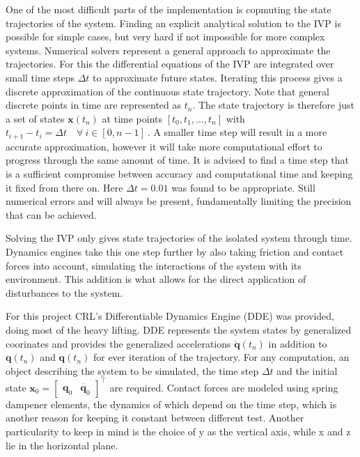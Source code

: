 One of the most difficult parts of the implementation is copmuting the state trajectories of the system. 
Finding an explicit analytical solution to the IVP is possible for simple cases, but very hard if not impossible for more complex systems. Numerical solvers represent a general approach to approximate the trajectories. For this the differential equations of the IVP are integrated over small time steps $\Delta t$ to approximate future states.
Iterating this process gives a discrete approximation of the continuous state trajectory. Note that general discrete points in time are represented as $t_n$.
The state trajectory is therefore just a set of states $\mathbf{x}(t_n)$ at time points $[t_0,t_1,\ldots, t_n]$ with $t_{i+1}-t_{i} = \Delta t\quad \forall\ i \in [0,n-1]\ $.
A smaller time step will result in a more accurate approximation, however it will take more computational effort to progress through the same amount of time.
It is advised to find a time step that is a sufficient compromise between accuracy and computational time and keeping it fixed from there on. Here $\Delta t = 0.01$ was found to be appropriate. 
Still numerical errors and will always be present, fundamentally limiting the precision that can be achieved. 

Solving the IVP only gives state trajectories of the isolated system through time.  Dynamics engines take this one step further by also taking friction and contact forces into account, simulating the interactions of the system with its environment. This addition is what allows for the direct application of disturbances to the system.

For this project CRL's Differentiable Dynamics Engine (DDE) was provided, doing most of the heavy lifting. %
DDE represents the system states by generalized coorinates and provides the generalized accelerations $\ddot{\mathbf{q}}(t_n)$ in addition to $\mathbf{q}(t_n)$ and $\dot{\mathbf{q}}(t_n)$ for ever iteration of the trajectory. For any computation, an object describing the system to be simulated, the time step $\Delta t$ and the initial state $\mathbf{x}_0 = \begin{bmatrix} \mathbf{q}_0&\dot{\mathbf{q}_0}\end{bmatrix}^\intercal$ are required. Contact forces are modeled using spring dampener elements, the dynamics of which depend on the time step, which is another reason for keeping it constant between different test. Another particularity to keep in mind is the choice of y as the vertical axis, while x and z lie in the horizontal plane. 



